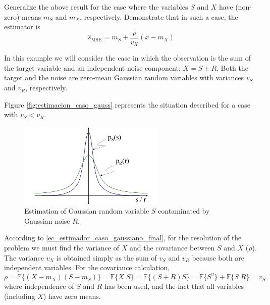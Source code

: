 \begin{exercise}
Generalize the above result for the case where the variables $S$ and $X$ have (non-zero) means $m_S$ and $m_X$, respectively. Demonstrate that in such a case, the estimator is
\begin{equation}
\hat s_{\text{MSE}} = m_S + \frac{\rho}{v_X} (x - m_X)
\end{equation}
\end{exercise}

\begin{example}
\label{ex:senialenruido}

In this example we will consider the case in which the observation is the sum of the target variable and an independent noise component: $X = S + R$. Both the target and the noise are zero-mean Gaussian random variables with variances $v_S$ and $v_R$, respectively.

Figure \eqref{fig:estimacion_caso_gauss} represents the situation described for a case with $v_S < v_R$.
\begin{figure}[htb]
  \begin{center}
  \includegraphics[width=7cm]{Figures//estimacion_caso_gauss.png}
    \caption{Estimation of Gaussian random variable $S$ contaminated by Gaussian noise $R$.}
    \label{fig:estimacion_caso_gauss}
  \end{center}
\end{figure}

According to \eqref{ec_estimador_caso_gaussiano_final}, for the resolution of the problem we must find the variance of $X$ and the covariance between $S$ and $X$ ($\rho$). The variance $v_X$ is obtained simply as the sum of $v_S$ and $v_R$ because both are independent variables. For the covariance calculation,
\begin{equation}
\rho = \mathbb{E} \{(X-m_X)(S-m_S)\} = \mathbb{E} \{X\;S\} = \mathbb{E} \{(S + R) S\} = \mathbb{E} \{S^2\} + \mathbb{E} \{S\;R\} = v_S
\end{equation}
where independence of $S$ and $R$ has been used, and the fact that all variables (including $X$) have zero means.


\end{example}
